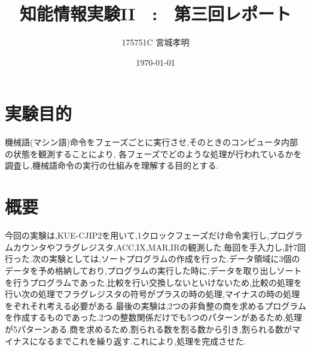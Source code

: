 \documentclass[a4paper,11pt,titlepage]{jarticle}
\title{知能情報実験II　:　第三回レポート}
\author{175751C 宮城孝明}
\date{\today}
\begin{document}
                                                                
\maketitle                                                                      
\tableofcontents                                                                
\clearpage                                                                      
\section{実験目的}        
機械語(マシン語)命令をフェーズごとに実行させ,そのときのコンピュータ内部の状態を観測することにより,
各フェーズでどのような処理が行われているかを調査し,機械語命令の実行の仕組みを理解する目的とする.
\section{概要}
今回の実験は,KUE-CJIP2を用いて,1クロックフェーズだけ命令実行し,プログラムカウンタやフラグレジスタ,ACC,IX,MAR,IRの観測した.毎回を手入力し,計7回行った.次の実験としては,ソートプログラムの作成を行った.データ領域に3個のデータを予め格納しており,プログラムの実行した時に,データを取り出しソートを行うプログラムであった.比較を行い交換しないといけないため,比較の処理を行い次の処理でフラグレジスタの符号がプラスの時の処理,マイナスの時の処理をぞれそれ考える必要がある.最後の実験は,2つの非負整の商を求めるプログラムを作成するものであった.2つの整数関係だけでも5つのパターンがあるため,処理が5パターンある.商を求めるため,割られる数を割る数から引き,割られる数がマイナスになるまでこれを繰り返す.これにより,処理を完成させた.
\end{document}
